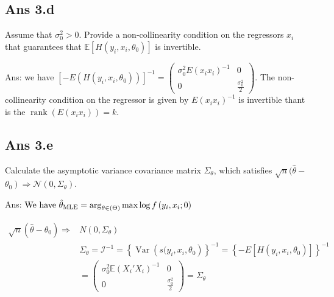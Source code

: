 \documentclass{article}
\begin{document}
\subsection*{Ans 3.d }Assume that $\sigma_0^2>0$. Provide a non-collinearity condition on the regressors $x_i$ that guarantees that $\mathbb{E}\left[H\left(y_i, x_i, \theta_0\right)\right]$ is invertible.

Ans: we have $\left[-E\left(H\left(y_i, x_i, \theta_0\right)\right)\right]^{-1}=\left(\begin{array}{cc}\sigma_0^2 E\left(x_i x_i\right)^{-1} & 0 \\ 0 & \frac{\sigma_0^2}{2}\end{array}\right)$. The non-collinearity condition on the regressor is given by $E\left(x_i x_i\right)^{-1}$ is invertible thant is the $\operatorname{rank}\left(E\left(x_i x_i\right)\right)=k$.

\subsection*{Ans 3.e }
Calculate the asymptotic variance covariance matrix $\Sigma_\theta$, which satisfies $\sqrt{n}(\hat{\theta}-$ $\left.\theta_0\right) \Rightarrow \mathcal{N}\left(0, \Sigma_\theta\right)$.

Ans: $\text{We have } \hat{\theta}_{\text{MLE}} = \operatorname{arg}_{\theta \in(\Theta)} \max \log f\left(y_i, x_i ; 0\right) \\ $

$\begin{aligned} 
\sqrt{n}(\hat{\theta} - \theta_0) \Rightarrow & N(0, \Sigma_\theta) \\ 
& \Sigma_\theta = \mathcal{I}^{-1} = \left\{\operatorname{Var}\left(s (y_i, x_i, \theta_0\right)\right\}^{-1} = \left\{-E\left[H\left(y_i, x_i, \theta_0\right)\right]\right\}^{-1} \\ 
& = \left(\begin{array}{cc} \sigma_0^2 \mathbb{E}(X_i' X_i)^{-1} & 0 \\ 0 & \frac{\sigma_0^2}{2} \end{array}\right) = \Sigma_\theta
\end{aligned}$
\end{document}
